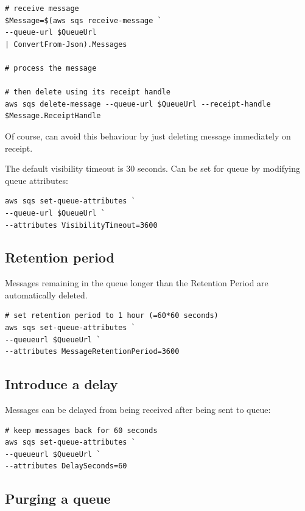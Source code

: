 \begin{verbatim}
# receive message
$Message=$(aws sqs receive-message `
--queue-url $QueueUrl 
| ConvertFrom-Json).Messages 

# process the message

# then delete using its receipt handle
aws sqs delete-message --queue-url $QueueUrl --receipt-handle $Message.ReceiptHandle
\end{verbatim}

Of course, can avoid this behaviour by just deleting message immediately
on receipt.

The default visibility timeout is 30 seconds. Can be set for queue by
modifying queue attributes:

\begin{verbatim}
aws sqs set-queue-attributes `
--queue-url $QueueUrl `
--attributes VisibilityTimeout=3600
\end{verbatim}

\subsection{Retention period}\label{retention-period}

Messages remaining in the queue longer than the Retention Period are
automatically deleted.

\begin{verbatim}
# set retention period to 1 hour (=60*60 seconds)
aws sqs set-queue-attributes `
--queueurl $QueueUrl `
--attributes MessageRetentionPeriod=3600
\end{verbatim}

\subsection{Introduce a delay}\label{introduce-a-delay}

Messages can be delayed from being received after being sent to queue:

\begin{verbatim}
# keep messages back for 60 seconds
aws sqs set-queue-attributes `
--queueurl $QueueUrl `
--attributes DelaySeconds=60
\end{verbatim}

\subsection{Purging a queue}\label{purging-a-queue}

